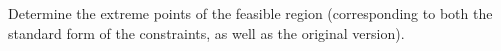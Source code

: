 Determine the extreme points of the feasible region (corresponding to both the standard form of the constraints, as well
as the original version).

\begin{solution}
  \ \\
  \vfill
  \ \\
\end{solution}
